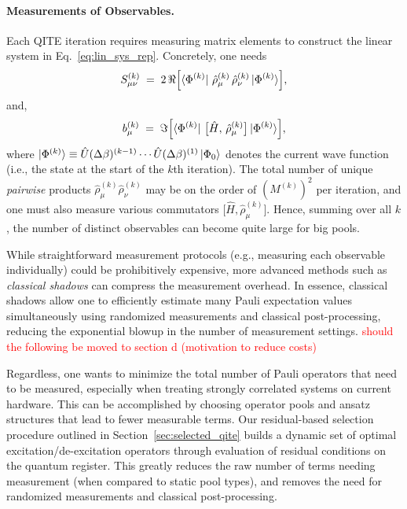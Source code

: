 \documentclass[aip,jcp,amsmath,amssymb, reprint]{revtex4-1}
\newcommand{\note}[2]{%
  \ifthenelse{\boolean{shownotes}}%
    {\textcolor{#1}{#2}}%
    {}%
}
\begin{document}
\paragraph{Measurements of Observables.}
Each QITE iteration requires measuring matrix elements to construct the linear system in Eq.~\eqref{eq:lin_sys_rep}. Concretely, one needs
\begin{equation}
S_{\mu \nu}^{(k)} 
\;=\; 
2 \,\Re \Bigl[ 
\bra{\Phi^{(k)}} 
\,\hat{\rho}_\mu^{(k)} \,\hat{\rho}_\nu^{(k)}
\ket{\Phi^{(k)}}
\Bigr],
\end{equation}
and,
\begin{equation}
b_{\mu}^{(k)}
\;=\;
\Im \Bigl[
\bra{\Phi^{(k)}}\,
\bigl[\hat{H},\,\hat{\rho}_\mu^{(k)}\bigr]
\ket{\Phi^{(k)}}
\Bigr],
\end{equation}
where $\ket{\Phi^{(k)}} \equiv \hat{U}(\Delta \beta)^{(k-1)} \cdots \hat{U}(\Delta \beta)^{(1)} \ket{\Phi_0}$ denotes the current wave function (i.e., the state at the start of the $k$th iteration). The total number of unique \textit{pairwise} products $\hat{\rho}_\mu^{(k)}\hat{\rho}_\nu^{(k)}$ may be on the order of $(M^{(k)})^2$ per iteration, and one must also measure various commutators $\bigl[\hat{H},\hat{\rho}_\mu^{(k)}\bigr]$. Hence, summing over all $k$, the number of distinct observables can become quite large for big pools. 

While straightforward measurement protocols (e.g., measuring each observable individually) could be prohibitively expensive, more advanced methods such as \textit{classical shadows}\cite{huang2020predicting} can compress the measurement overhead. In essence, classical shadows allow one to efficiently estimate many Pauli expectation values simultaneously using randomized measurements and classical post-processing, reducing the exponential blowup in the number of measurement settings.
\note{red}{should the following be moved to section d (motivation to reduce costs)}
Regardless, one wants to minimize the total number of Pauli operators that need to be measured, especially when treating strongly correlated systems on current hardware. This can be accomplished by choosing operator pools and ansatz structures that lead to fewer measurable terms. Our residual-based selection procedure outlined in Section~\ref{sec:selected_qite} builds a dynamic set of optimal excitation/de-excitation operators through evaluation of residual conditions on the quantum register. This greatly reduces the raw number of terms needing measurement (when compared to static pool types), and removes the need for randomized measurements and classical post-processing. 
\end{document}
